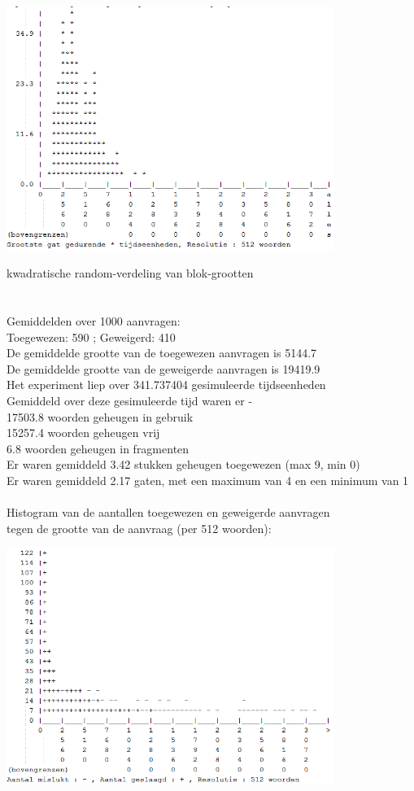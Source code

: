 \documentclass[a4paper]{article}
\begin{document}
			\begin{center}
				\includegraphics[width=0.8\textwidth]{ff4.png}
			\end{center}
			kwadratische random-verdeling van blok-grootten\\
			\\
			\\
			Gemiddelden over 1000 aanvragen:\\
			Toegewezen: 590 ; Geweigerd: 410\\
			De gemiddelde grootte van de toegewezen aanvragen is 5144.7\\
			De gemiddelde grootte van de geweigerde aanvragen is 19419.9\\
			Het experiment liep over 341.737404 gesimuleerde tijdseenheden\\
			Gemiddeld over deze gesimuleerde tijd waren er - \\
			 17503.8 woorden geheugen in gebruik\\
			 15257.4 woorden geheugen vrij\\
			     6.8 woorden geheugen in fragmenten\\
			Er waren gemiddeld     3.42 stukken geheugen toegewezen (max 9, min 0)\\
			Er waren gemiddeld     2.17 gaten, met een maximum van 4 en een minimum van 1\\
			\\
			Histogram van de aantallen toegewezen en geweigerde aanvragen\\
			tegen de grootte van de aanvraag (per 512 woorden):
			\begin{center}
				\includegraphics[width=0.8\textwidth]{wf5.png}
			\end{center}
\end{document}

